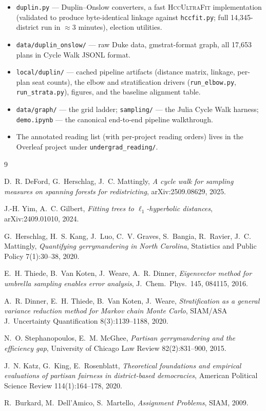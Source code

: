 \documentclass[11pt]{article}
\newcommand{\hccultra}{\textsc{HccUltraFit}}
\begin{document}
\begin{itemize}[itemsep=2pt]
  \item \texttt{duplin.py} --- Duplin--Onslow converters, a fast
    \hccultra{} implementation (validated to produce byte-identical
    linkage against \texttt{hccfit.py}; full 14{,}345-district run in
    $\approx 3$ minutes), election utilities.
  \item \texttt{data/duplin\_onslow/} --- raw Duke data, gmstrat-format
    graph, all 17{,}653 plans in Cycle Walk JSONL format.
  \item \texttt{local/duplin/} --- cached pipeline artifacts (distance
    matrix, linkage, per-plan seat counts), the elbow and
    stratification drivers (\texttt{run\_elbow.py},
    \texttt{run\_strata.py}), figures, and the baseline alignment
    table.
  \item \texttt{data/graph/} --- the grid ladder; \texttt{sampling/}
    --- the Julia Cycle Walk harness; \texttt{demo.ipynb} --- the
    canonical end-to-end pipeline walkthrough.
  \item The annotated reading list (with per-project reading orders)
    lives in the Overleaf project under
    \texttt{undergrad\_reading/}.
\end{itemize}

\begin{thebibliography}{9}

D.~R. DeFord, G.~Herschlag, J.~C. Mattingly,
\emph{A cycle walk for sampling measures on spanning forests for
redistricting}, arXiv:2509.08629, 2025.

J.-H. Yim, A.~C. Gilbert,
\emph{Fitting trees to $\ell_1$-hyperbolic distances},
arXiv:2409.01010, 2024.

G.~Herschlag, H.~S. Kang, J.~Luo, C.~V. Graves, S.~Bangia,
R.~Ravier, J.~C. Mattingly,
\emph{Quantifying gerrymandering in North Carolina},
Statistics and Public Policy 7(1):30--38, 2020.

E.~H. Thiede, B.~Van Koten, J.~Weare, A.~R. Dinner,
\emph{Eigenvector method for umbrella sampling enables error
analysis}, J.~Chem.\ Phys.\ 145, 084115, 2016.

A.~R. Dinner, E.~H. Thiede, B.~Van Koten, J.~Weare,
\emph{Stratification as a general variance reduction method for
Markov chain Monte Carlo}, SIAM/ASA J.~Uncertainty Quantification
8(3):1139--1188, 2020.

N.~O. Stephanopoulos, E.~M. McGhee,
\emph{Partisan gerrymandering and the efficiency gap},
University of Chicago Law Review 82(2):831--900, 2015.

J.~N. Katz, G.~King, E.~Rosenblatt,
\emph{Theoretical foundations and empirical evaluations of partisan
fairness in district-based democracies},
American Political Science Review 114(1):164--178, 2020.

R.~Burkard, M.~Dell'Amico, S.~Martello,
\emph{Assignment Problems}, SIAM, 2009.

\end{thebibliography}
\end{document}
